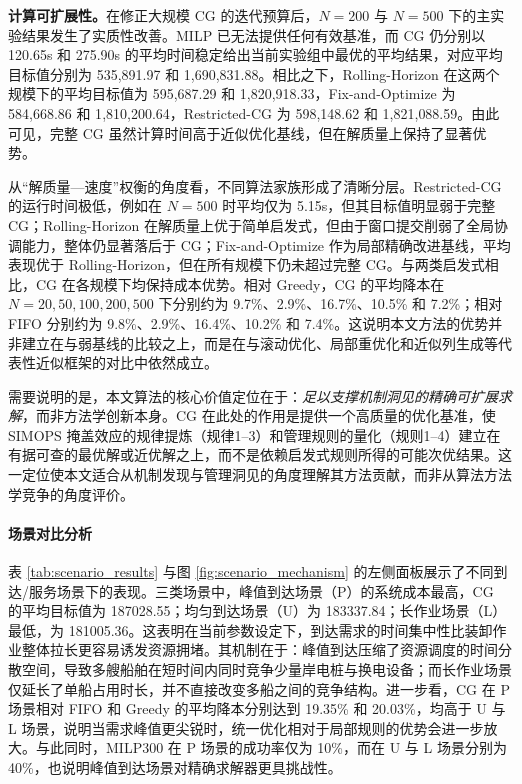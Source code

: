 \documentclass[UTF8, a4paper, 12pt]{ctexart}
\theoremstyle{plain}
\theoremstyle{definition}
\theoremstyle{remark}
\begin{document}
\textbf{计算可扩展性。}在修正大规模 CG 的迭代预算后，$N=200$ 与 $N=500$ 下的主实验结果发生了实质性改善。MILP 已无法提供任何有效基准，而 CG 仍分别以 120.65s 和 275.90s 的平均时间稳定给出当前实验组中最优的平均结果，对应平均目标值分别为 535{,}891.97 和 1{,}690{,}831.88。相比之下，Rolling-Horizon 在这两个规模下的平均目标值为 595{,}687.29 和 1{,}820{,}918.33，Fix-and-Optimize 为 584{,}668.86 和 1{,}810{,}200.64，Restricted-CG 为 598{,}148.62 和 1{,}821{,}088.59。由此可见，完整 CG 虽然计算时间高于近似优化基线，但在解质量上保持了显著优势。

从“解质量—速度”权衡的角度看，不同算法家族形成了清晰分层。Restricted-CG 的运行时间极低，例如在 $N=500$ 时平均仅为 5.15s，但其目标值明显弱于完整 CG；Rolling-Horizon 在解质量上优于简单启发式，但由于窗口提交削弱了全局协调能力，整体仍显著落后于 CG；Fix-and-Optimize 作为局部精确改进基线，平均表现优于 Rolling-Horizon，但在所有规模下仍未超过完整 CG。与两类启发式相比，CG 在各规模下均保持成本优势。相对 Greedy，CG 的平均降本在 $N=20,50,100,200,500$ 下分别约为 9.7\%、2.9\%、16.7\%、10.5\% 和 7.2\%；相对 FIFO 分别约为 9.8\%、2.9\%、16.4\%、10.2\% 和 7.4\%。这说明本文方法的优势并非建立在与弱基线的比较之上，而是在与滚动优化、局部重优化和近似列生成等代表性近似框架的对比中依然成立。

需要说明的是，本文算法的核心价值定位在于：\emph{足以支撑机制洞见的精确可扩展求解}，而非方法学创新本身。CG 在此处的作用是提供一个高质量的优化基准，使 SIMOPS 掩盖效应的规律提炼（规律1--3）和管理规则的量化（规则1--4）建立在有据可查的最优解或近优解之上，而不是依赖启发式规则所得的可能次优结果。这一定位使本文适合从机制发现与管理洞见的角度理解其方法贡献，而非从算法方法学竞争的角度评价。

\begin{table}[htbp]
    \centering
    \caption{不同规模下各算法的总体对比结果}
    \label{tab:main_results}
    \scriptsize
    
\end{table}

\paragraph{场景对比分析}
表 \ref{tab:scenario_results} 与图 \ref{fig:scenario_mechanism} 的左侧面板展示了不同到达/服务场景下的表现。三类场景中，峰值到达场景（P）的系统成本最高，CG 的平均目标值为 187028.55；均匀到达场景（U）为 183337.84；长作业场景（L）最低，为 181005.36。这表明在当前参数设定下，到达需求的时间集中性比装卸作业整体拉长更容易诱发资源拥堵。其机制在于：峰值到达压缩了资源调度的时间分散空间，导致多艘船舶在短时间内同时竞争少量岸电桩与换电设备；而长作业场景仅延长了单船占用时长，并不直接改变多船之间的竞争结构。进一步看，CG 在 P 场景相对 FIFO 和 Greedy 的平均降本分别达到 19.35\% 和 20.03\%，均高于 U 与 L 场景，说明当需求峰值更尖锐时，统一优化相对于局部规则的优势会进一步放大。与此同时，MILP300 在 P 场景的成功率仅为 10\%，而在 U 与 L 场景分别为 40\%，也说明峰值到达场景对精确求解器更具挑战性。
\end{document}
